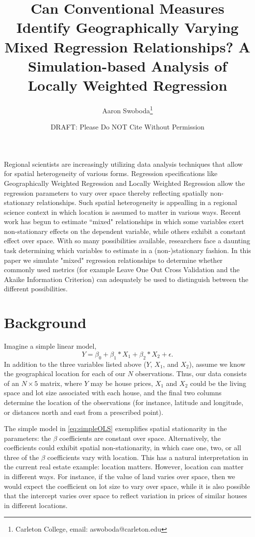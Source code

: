 \documentclass{article}\usepackage[]{graphicx}\usepackage[]{color}
\title{Can Conventional Measures Identify Geographically Varying Mixed Regression Relationships? A Simulation-based Analysis of Locally Weighted Regression}
\author{Aaron Swoboda\thanks{Carleton College, email: aswoboda@carleton.edu}}
\date{DRAFT: Please Do NOT Cite Without Permission}
\begin{document}
\maketitle






Regional scientists are increasingly utilizing data analysis techniques that allow for spatial heterogeneity of various forms. Regression specifications like Geographically Weighted Regression and Locally Weighted Regression allow the regression parameters to vary over space thereby reflecting spatially non-stationary relationships. Such spatial heterogeneity is appealling in a regional science context in which location is assumed to matter in various ways. Recent work has begun to estimate ``mixed" relationships in which some variables exert non-stationary effects on the dependent variable, while others exhibit a constant effect over space. With so many possibilities available, researchers face a daunting task determining which variables to estimate in a (non-)stationary fashion. In this paper we simulate "mixed" regression relationships to determine whether commonly used metrics (for example Leave One Out Cross Validation and the Akaike Information Criterion) can adequately be used to distinguish between the different possibilities.


\section{Background}

Imagine a simple linear model,
\begin{equation}\label{eq:simpleOLS}
Y = \beta _0 + \beta _1 *X_1 + \beta _2 * X_2 + \epsilon .
\end{equation}
In addition to the three variables listed above ($Y$, $X_1$, and $X_2$), assume we know the geographical location for each of our $N$ observations. Thus, our data consists of an $N \times 5$ matrix, where $Y$ may be house prices, $X_1$ and $X_2$ could be the living space and lot size associated with each house, and the final two columns determine the location of the observations (for instance, latitude and longitude, or distances north and east from a prescribed point).

The simple model in \eqref{eq:simpleOLS} exemplifies spatial stationarity in the parameters: the $\beta$ coefficients are constant over space. Alternatively, the coefficients could exhibit spatial non-stationarity, in which case one, two, or all three of the $\beta$ coefficients vary with location. This has a natural interpretation in the current real estate example: location matters. However, location can matter in different ways. For instance, if the value of land varies over space, then we would expect the coefficient on lot size to vary over space, while it is also possible that the intercept varies over space to reflect variation in prices of similar houses in different locations. 
\end{document}
